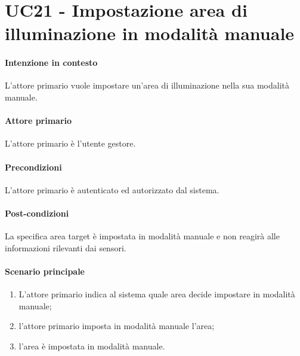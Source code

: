 \section{UC21 - Impostazione area di illuminazione in modalità manuale}\label{uc:21}
\paragraph{Intenzione in contesto} L'attore primario vuole impostare un'area di illuminazione nella sua modalità manuale.
\paragraph{Attore primario} L'attore primario è l'utente gestore.
\paragraph{Precondizioni}  L'attore primario è autenticato ed autorizzato dal sistema.
\paragraph{Post-condizioni} La specifica area target è impostata in modalità manuale e non reagirà alle informazioni rilevanti dai sensori.
\paragraph{Scenario principale}
\begin{enumerate}
    \item L'attore primario indica al sistema quale area decide impostare in modalità manuale;
    \item l'attore primario imposta in modalità manuale l'area;
    \item l'area è impostata in modalità manuale.
\end{enumerate}